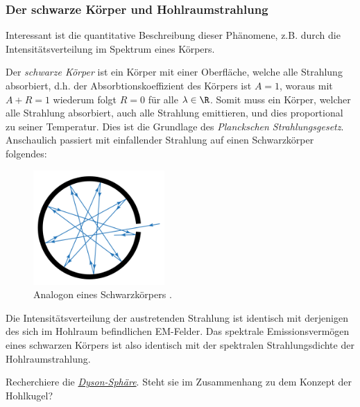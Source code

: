 \documentclass{subfiles}
\begin{document}
            \subsubsection*{Der schwarze Körper und Hohlraumstrahlung}

                Interessant ist die quantitative Beschreibung dieser Phänomene, z.B. durch die Intensitätsverteilung im Spektrum eines Körpers. 

                Der \emph{schwarze Körper} ist ein Körper mit einer Oberfläche, welche alle Strahlung absorbiert, d.h. der Absorbtionskoeffizient des Körpers ist $A=1$, woraus mit $A+R=1$ wiederum folgt $R=0$ für alle $\lambda\in\R$. Somit muss ein Körper, welcher alle Strahlung absorbiert, auch alle Strahlung emittieren, und dies proportional zu seiner Temperatur. Dies ist die Grundlage des \emph{Planckschen Strahlungsgesetz}. Anschaulich passiert mit einfallender Strahlung auf einen Schwarzkörper folgendes:
                \begin{figure}[H]
                    \centering
                    \includegraphics[width=5cm]{Bilddateien/Black_body_realization.svg.png}
                    \caption{Analogon eines Schwarzkörpers \cite{wiki:BlackBody}.}
                    \label{fig:SchwarzkoerperSchema}
                \end{figure}
                Die Intensitätsverteilung der austretenden Strahlung ist identisch mit derjenigen des sich im Hohlraum befindlichen EM-Felder. Das spektrale Emissionsvermögen eines schwarzen Körpers ist also identisch mit der spektralen Strahlungsdichte der Hohlraumstrahlung. 

                \begin{Aufgabe}
                    \nr{} Recherchiere die \href{https://de.wikipedia.org/wiki/Dyson-Sphäre}{\emph{Dyson-Sphäre}}. Steht sie im Zusammenhang zu dem Konzept der Hohlkugel? 
                \end{Aufgabe}
\end{document}

